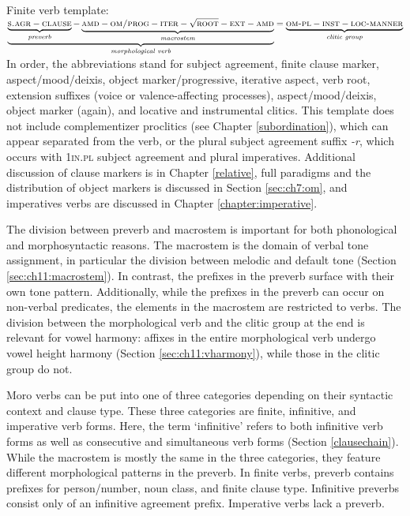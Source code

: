 \ea   \label{template} {Finite verb template}:\\ 
$\underbrace{\underbrace{\textsc{s.agr} - \textsc{clause}}_\textit{preverb}-  \underbrace{\textsc{amd} - \textsc{om/prog} - \textsc{iter} - \sqrt{\textsc{root}} - \textsc{ext} - \textsc{amd}}_\textit{macrostem}}_\textit{morphological verb}= \underbrace{\textsc{om-pl}-\textsc{inst}-\textsc{loc-manner}}_\textit{clitic group}$
\z 
In order, the abbreviations stand for subject agreement, finite clause marker, aspect/mood/deixis, object marker/progressive, iterative aspect, verb root, extension suffixes (voice or valence-affecting processes), aspect/mood/deixis, object marker (again), and locative and instrumental clitics. This template does not include complementizer proclitics (see Chapter \ref{subordination}), which can appear separated from the verb, or the plural subject agreement suffix \textit{-r}, which occurs with 1\textsc{in.pl} subject agreement and plural imperatives. Additional discussion of clause markers is in Chapter \ref{relative}, full paradigms and the distribution of object markers is discussed in Section \ref{sec:ch7:om}, and imperatives verbs are discussed in Chapter \ref{chapter:imperative}.

The division between preverb and macrostem is important for both phonological and morphosyntactic reasons. The macrostem is the domain of verbal tone assignment, in particular the division between melodic and default tone (Section \ref{sec:ch11:macrostem}). In contrast, the prefixes in the preverb surface with their own tone pattern. Additionally, while the prefixes in the preverb can occur on non-verbal predicates, the elements in the macrostem are restricted to verbs. The division between the morphological verb and the clitic group at the end is relevant for vowel harmony: affixes in the entire morphological verb undergo vowel height harmony (Section \ref{sec:ch11:vharmony}), while those in the clitic group do not.

Moro verbs can be put into one of three categories depending on their syntactic context and clause type. These three categories are finite, infinitive, and imperative verb forms. Here, the term `infinitive' refers to both infinitive verb forms as well as consecutive and simultaneous verb forms (Section \ref{clausechain}). While the macrostem is mostly the same in the three categories, they feature different morphological patterns in the preverb. In finite verbs, preverb contains prefixes for person/number, noun class, and finite clause type. Infinitive preverbs consist only of an infinitive agreement prefix. Imperative verbs lack a preverb. 

